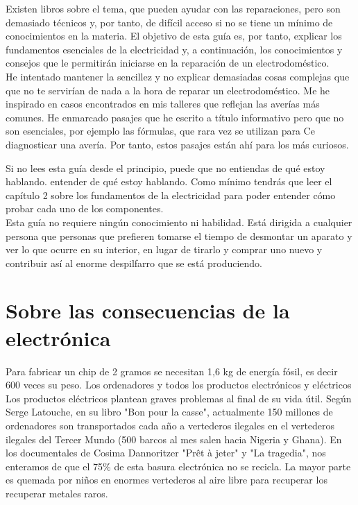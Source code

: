 \documentclass[a5paper,twoside,openany]{book}
\begin{document}
Existen libros sobre el tema, que pueden ayudar con las reparaciones, pero son demasiado técnicos  y, por tanto, de difícil acceso si no se tiene un mínimo de conocimientos en la materia.
El objetivo de esta guía es, por tanto, explicar los fundamentos esenciales de la electricidad
y, a continuación, los conocimientos y consejos que le permitirán iniciarse en la
reparación de un electrodoméstico.\\

He intentado mantener la sencillez y no explicar demasiadas cosas complejas que
que no te servirían de nada a la hora de reparar un electrodoméstico. Me he inspirado en casos
encontrados en mis talleres que reflejan las averías más comunes.
He enmarcado pasajes que he escrito a título informativo pero que no son
esenciales, por ejemplo las fórmulas, que rara vez se utilizan para Ce
diagnosticar una avería.
Por tanto, estos pasajes están ahí para los más curiosos.

Si no lees esta guía desde el principio, puede que no entiendas de qué estoy hablando.
entender de qué estoy hablando.
Como mínimo tendrás que leer el capítulo 2 sobre los fundamentos de la electricidad para poder
entender cómo probar cada uno de los componentes.\\

Esta guía no requiere ningún conocimiento ni habilidad. Está dirigida a cualquier persona que
personas que prefieren tomarse el tiempo de desmontar un aparato y ver
lo que ocurre en su interior, en lugar de tirarlo y comprar uno nuevo
y contribuir así al enorme despilfarro que se está produciendo.

\section{Sobre las consecuencias de la electrónica}

Para fabricar un chip de 2 gramos se necesitan 1,6 kg de energía fósil, es decir
600 veces su peso. Los ordenadores y todos los productos electrónicos y eléctricos
Los productos eléctricos plantean graves problemas al final de su vida útil.
Según Serge Latouche, en su libro "Bon pour la casse", actualmente
150 millones de ordenadores son transportados cada año a vertederos ilegales en el
vertederos ilegales del Tercer Mundo (500 barcos al mes salen hacia Nigeria y
Ghana).
En los documentales de Cosima Dannoritzer "Prêt à jeter" y "La tragedia", nos enteramos de que el 75\% de esta basura electrónica no se recicla.
La mayor parte es quemada por niños en enormes vertederos al aire libre para recuperar los
recuperar metales raros.
\end{document}
